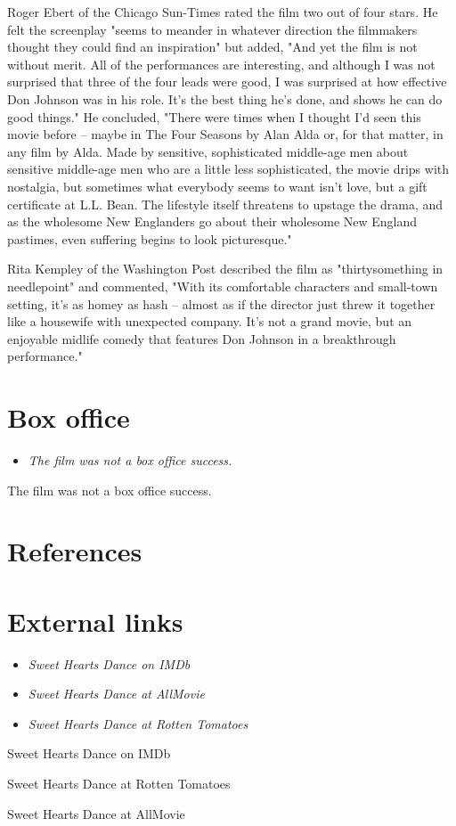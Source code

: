 Roger Ebert of the Chicago Sun-Times rated the film two out of four
stars. He felt the screenplay "seems to meander in whatever direction
the filmmakers thought they could find an inspiration" but added, "And
yet the film is not without merit. All of the performances are
interesting, and although I was not surprised that three of the four
leads were good, I was surprised at how effective Don Johnson was in his
role. It's the best thing he's done, and shows he can do good things."
He concluded, "There were times when I thought I'd seen this movie
before -- maybe in The Four Seasons by Alan Alda or, for that matter, in
any film by Alda. Made by sensitive, sophisticated middle-age men about
sensitive middle-age men who are a little less sophisticated, the movie
drips with nostalgia, but sometimes what everybody seems to want isn't
love, but a gift certificate at L.L. Bean. The lifestyle itself
threatens to upstage the drama, and as the wholesome New Englanders go
about their wholesome New England pastimes, even suffering begins to
look picturesque."

Rita Kempley of the Washington Post described the film as
"thirtysomething in needlepoint" and commented, "With its comfortable
characters and small-town setting, it's as homey as hash -- almost as if
the director just threw it together like a housewife with unexpected
company. It's not a grand movie, but an enjoyable midlife comedy that
features Don Johnson in a breakthrough performance."

\section{Box office}\label{box-office}

\begin{itemize}
\item
  \emph{The film was not a box office success.}
\end{itemize}

The film was not a box office success.

\section{References}\label{references}

\section{External links}\label{external-links}

\begin{itemize}
\item
  \emph{Sweet Hearts Dance on IMDb}
\item
  \emph{Sweet Hearts Dance at AllMovie}
\item
  \emph{Sweet Hearts Dance at Rotten Tomatoes}
\end{itemize}

Sweet Hearts Dance on IMDb

Sweet Hearts Dance at Rotten Tomatoes

Sweet Hearts Dance at AllMovie
